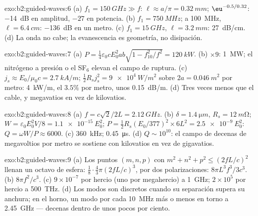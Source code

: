 \begin{solution}{exo:b2:guided-waves:6}
(a) $f_1 = \qty{150}{GHz} \gg f$: $\ell \approx a/\pi = \qty{0.32}{mm}$; $\eu^{-0.5/0.32}$:
\qty{-14}{dB} en amplitud, $-27$ en potencia. (b) $f_1 = \qty{750}{MHz}$; a \qty{100}{MHz},
$\ell = \qty{6.4}{cm}$: \qty{-136}{dB} en un metro. (c) $f_1 = \qty{15}{GHz}$, $\ell =
\qty{3.2}{mm}$: \qty{27}{dB/cm}. (d) La onda no cabe; la evanescencia es
geometría, no disipación.
\end{solution}

\begin{solution}{exo:b2:guided-waves:7}
(a) $P = \tfrac14\varepsilon_0cE_0^2ab\sqrt{1 - f_{10}^2/f^2} = \qty{120}{kW}$. (b) $\times9$:
\qty{1}{MW}; el nitrógeno a presión o el SF$_6$ elevan el campo de ruptura. (c)
$j_s \approx E_0/\mu_0c = \qty{2.7}{kA/m}$; $\tfrac12R_sj_s^2 = \qty{9e4}{W/m^2}$ sobre $2a =
\qty{0.046}{m^2}$ por metro: \qty{4}{kW/m}, el $3.5\%$ por metro, unos \qty{0.15}{dB/m}.
(d) Tres veces menos que el cable, y megavatios en vez de
kilovatios.
\end{solution}

\begin{solution}{exo:b2:guided-waves:8}
(a) $f = c\sqrt2/2L = \qty{2.12}{GHz}$. (b) $\delta = \qty{1.4}{\micro m}$, $R_s = \qty{12}{m\ohm}$;
$W = \varepsilon_0E_0^2V/8 = \qty{1.1e-15}{}E_0^2$; $P = \tfrac12R_s(E_0/377)^2 \times 6L^2 =
\qty{2.5e-9}{}E_0^2$: $Q = \omega W/P \approx 6000$. (c) \qty{360}{kHz}; \qty{0.45}{\micro s}. (d)
$Q \sim 10^{10}$: el campo de decenas de megavoltios por metro se sostiene con
kilovatios en vez de gigavatios.
\end{solution}

\begin{solution}{exo:b2:guided-waves:9}
(a) Los puntos $(m, n, p)$ con $m^2 + n^2 + p^2 \le (2fL/c)^2$ llenan un octavo
de esfera: $\tfrac18\cdot\tfrac43\pi(2fL/c)^3$, por dos polarizaciones:
$8\pi L^3f^3/3c^3$. (b) $8\pi f^2/c^3$. (c) $9 \times 10^{-7}$ por hercio (uno por
megahercio) a \qty{1}{GHz}; $2 \times 10^5$ por hercio a \qty{500}{THz}. (d) Los modos son
discretos cuando su separación supera su anchura; en el horno, un modo
por cada \qty{10}{MHz} más o menos en torno a \qty{2.45}{GHz} --- decenas dentro de unos
pocos por ciento.
\end{solution}

